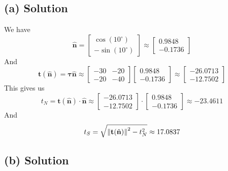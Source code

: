\subsection*{(a) Solution}
We have 
\begin{equation*}
    \hat{\mathbf{n}} = 
    \begin{bmatrix}
        \cos(10^{\circ}) \\
        -\sin(10^{\circ})
    \end{bmatrix}
    \approx 
    \begin{bmatrix}
        0.9848 \\
        -0.1736
    \end{bmatrix}
\end{equation*}
And 
\begin{equation*}
    \mathbf{t}(\hat{\mathbf{n}}) = \boldsymbol{\tau}\hat{\mathbf{n}} \approx
    \begin{bmatrix}
        -30 & -20 \\
        -20 & -40
    \end{bmatrix}
    \begin{bmatrix}
        0.9848 \\
        -0.1736
    \end{bmatrix}
    \approx
    \begin{bmatrix}
        -26.0713 \\
        -12.7502
    \end{bmatrix}
\end{equation*}
This gives us 
\begin{equation*}
    t_N = \mathbf{t}(\hat{\mathbf{n}}) \cdot \hat{\mathbf{n}} \approx 
    \begin{bmatrix}
        -26.0713 \\
        -12.7502
    \end{bmatrix}
    \cdot
    \begin{bmatrix}
        0.9848 \\
        -0.1736
    \end{bmatrix}
    \approx -23.4611
\end{equation*}
And 
\begin{equation*}
    t_S = \sqrt{\left\lVert\mathbf{t}(\hat{\mathbf{n}})\right\rVert^2 - t_N^2} \approx 17.0837
\end{equation*}


\subsection*{(b) Solution}

